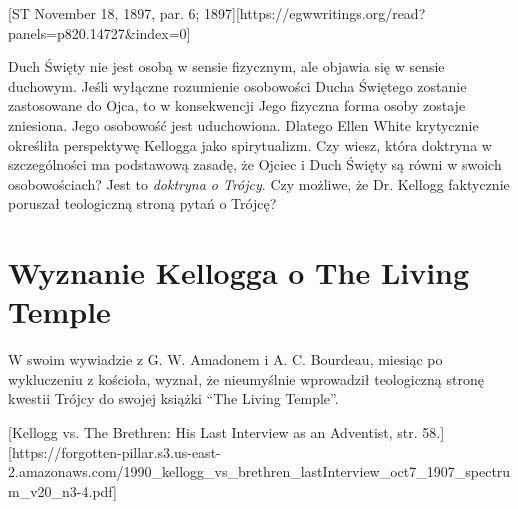 [ST November 18, 1897, par. 6; 1897][https://egwwritings.org/read?panels=p820.14727&index=0]

Duch Święty nie jest osobą w sensie fizycznym, ale objawia się w sensie duchowym. Jeśli wyłączne rozumienie osobowości Ducha Świętego zostanie zastosowane do Ojca, to w konsekwencji Jego fizyczna forma osoby zostaje zniesiona. Jego osobowość jest uduchowiona. Dlatego Ellen White krytycznie określiła perspektywę Kellogga jako spirytualizm. Czy wiesz, która doktryna w szczególności ma podstawową zasadę, że Ojciec i Duch Święty są równi w swoich osobowościach? Jest to \textit{doktryna o Trójcy}. Czy możliwe, że Dr. Kellogg faktycznie poruszał teologiczną stroną pytań o Trójcę?

\section*{Wyznanie Kellogga o The Living Temple}

W swoim wywiadzie z G. W. Amadonem i A. C. Bourdeau, miesiąc po wykluczeniu z kościoła, wyznał, że nieumyślnie wprowadził teologiczną stronę kwestii Trójcy do swojej książki “The Living Temple”.

[Kellogg vs. The Brethren: His Last Interview as an Adventist, str. 58.][https://forgotten-pillar.s3.us-east-2.amazonaws.com/1990\_kellogg\_vs\_brethren\_lastInterview\_oct7\_1907\_spectrum\_v20\_n3-4.pdf]

